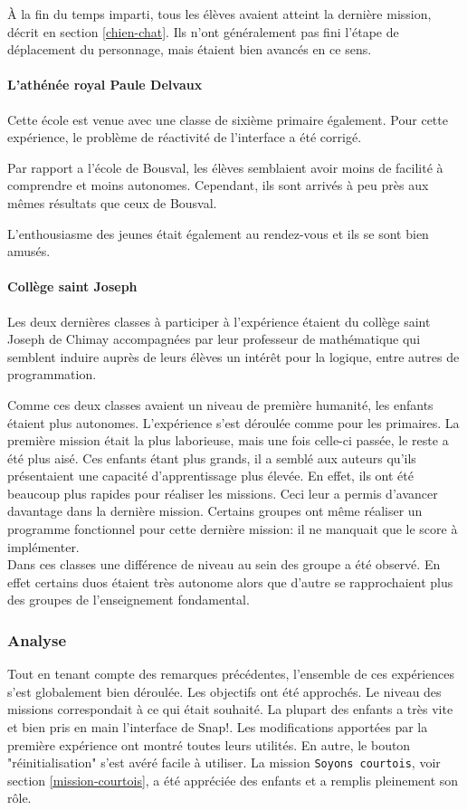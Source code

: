 À la fin du temps imparti, tous les élèves avaient atteint la dernière mission, décrit en section \ref{chien-chat}. Ils n'ont généralement pas fini l'étape de déplacement du personnage, mais étaient bien avancés en ce sens.

\paragraph{L'athénée royal Paule Delvaux}
Cette école est venue avec une classe de sixième primaire également. Pour cette expérience, le problème de réactivité de l'interface a été corrigé.

Par rapport a l'école de Bousval, les élèves semblaient avoir moins de facilité à comprendre et moins autonomes.
Cependant, ils sont arrivés à peu près aux mêmes résultats que ceux de Bousval.

L'enthousiasme des jeunes était également au rendez-vous et ils se sont bien amusés.

\paragraph{Collège saint Joseph}
Les deux dernières classes à participer à l'expérience étaient du collège saint Joseph de Chimay accompagnées par leur professeur de mathématique qui semblent induire auprès de leurs élèves un intérêt pour la logique, entre autres de programmation.

Comme ces deux classes avaient un niveau de première humanité, les enfants étaient plus autonomes. L'expérience s'est déroulée comme pour les primaires. La première mission était la plus laborieuse, mais une fois celle-ci passée, le reste a été plus aisé. Ces enfants étant plus grands, il a semblé aux auteurs qu'ils présentaient une capacité d'apprentissage plus élevée. En effet, ils ont été beaucoup plus rapides pour réaliser les missions. Ceci leur a permis d'avancer davantage dans la dernière mission. Certains groupes ont même réaliser un programme fonctionnel pour cette dernière mission: il ne manquait que le score à implémenter.\\

Dans ces classes une différence de niveau au sein des groupe a été observé. En effet certains duos étaient très autonome alors que d'autre se rapprochaient plus des groupes de l'enseignement fondamental.

\subsubsection{Analyse}
\label{analyse-scienceinfuse}
Tout en tenant compte des remarques précédentes, l'ensemble de ces expériences s'est globalement bien déroulée. Les objectifs ont été approchés. Le niveau des missions correspondait à ce qui était souhaité. La plupart des enfants a très vite et bien pris en main l'interface de Snap!. Les modifications apportées par la première expérience ont montré toutes leurs utilités. En autre, le bouton "réinitialisation" s'est avéré facile à utiliser. La mission \texttt{Soyons courtois}, voir section \ref{mission-courtois}, a été appréciée des enfants et a remplis pleinement son rôle.\\

